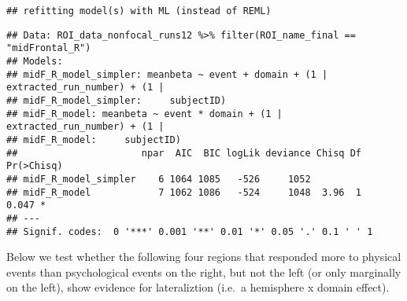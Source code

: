 \documentclass[
]{article}
\begin{document}
\begin{verbatim}
## refitting model(s) with ML (instead of REML)
\end{verbatim}

\begin{verbatim}
## Data: ROI_data_nonfocal_runs12 %>% filter(ROI_name_final == "midFrontal_R")
## Models:
## midF_R_model_simpler: meanbeta ~ event + domain + (1 | extracted_run_number) + (1 | 
## midF_R_model_simpler:     subjectID)
## midF_R_model: meanbeta ~ event * domain + (1 | extracted_run_number) + (1 | 
## midF_R_model:     subjectID)
##                      npar  AIC  BIC logLik deviance Chisq Df Pr(>Chisq)  
## midF_R_model_simpler    6 1064 1085   -526     1052                      
## midF_R_model            7 1062 1086   -524     1048  3.96  1      0.047 *
## ---
## Signif. codes:  0 '***' 0.001 '**' 0.01 '*' 0.05 '.' 0.1 ' ' 1
\end{verbatim}

Below we test whether the following four regions that responded more to
physical events than psychological events on the right, but not the left
(or only marginally on the left), show evidence for lateraliztion
(i.e.~a hemisphere x domain effect).
\end{document}
